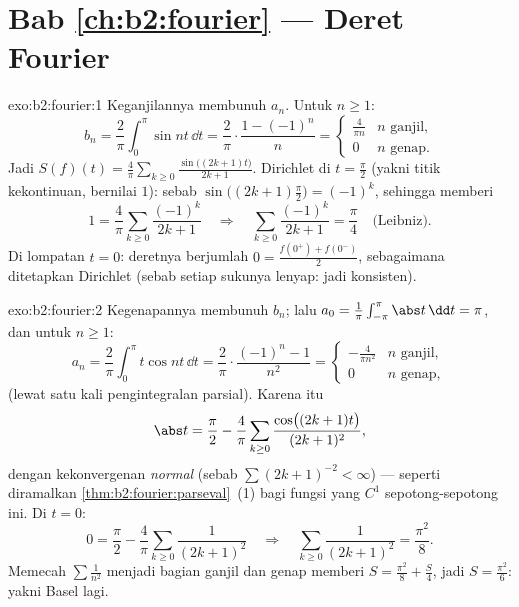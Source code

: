 \section*{Bab \ref{ch:b2:fourier} --- Deret Fourier}

\begin{solution}{exo:b2:fourier:1}
Keganjilannya membunuh $a_n$. Untuk $n \geq 1$:
\[
b_n = \frac{2}{\pi}\int_0^{\pi} \sin nt\,\dd t
= \frac{2}{\pi}\cdot\frac{1 - (-1)^n}{n}
= \begin{cases} \frac{4}{\pi n} & n \text{ ganjil},\\ 0 & n
\text{ genap}. \end{cases}
\]
Jadi $S(f)(t) = \frac{4}{\pi}\sum_{k\geq0} \frac{\sin\bigl((2k+1)t
\bigr)}{2k+1}$. Dirichlet di $t = \frac\pi2$ (yakni titik kekontinuan,
bernilai $1$): sebab $\sin\bigl((2k+1)\frac\pi2\bigr) = (-1)^k$, sehingga memberi
\[
1 = \frac4\pi \sum_{k\geq0}\frac{(-1)^k}{2k+1}
\quad\Longrightarrow\quad
\sum_{k\geq0}\frac{(-1)^k}{2k+1} = \frac{\pi}{4}
\quad\text{(Leibniz)}.
\]
Di lompatan $t = 0$: deretnya berjumlah $0 = \frac{f(0^+) +
f(0^-)}{2}$, sebagaimana ditetapkan Dirichlet (sebab setiap sukunya lenyap:
jadi konsisten).
\end{solution}

\begin{solution}{exo:b2:fourier:2}
Kegenapannya membunuh $b_n$; lalu $a_0 = \frac{1}{\pi}\int_{-\pi}^\pi\abs
t\,\dd t = \pi$, dan untuk $n \geq 1$:
\[
a_n = \frac{2}{\pi}\int_0^\pi t\cos nt\,\dd t
= \frac{2}{\pi}\cdot\frac{(-1)^n - 1}{n^2}
= \begin{cases} -\frac{4}{\pi n^2} & n \text{ ganjil},\\ 0 & n
\text{ genap}, \end{cases}
\]
(lewat satu kali pengintegralan parsial). Karena itu
\[
\abs t = \frac{\pi}{2} - \frac{4}{\pi}\sum_{k\geq0}
\frac{\cos\bigl((2k+1)t\bigr)}{(2k+1)^2} ,
\]
dengan kekonvergenan \emph{normal} (sebab $\sum (2k+1)^{-2} < \infty$) --- seperti
diramalkan \cref{thm:b2:fourier:parseval}~(1) bagi fungsi  yang
$C^1$ sepotong-sepotong ini. Di $t = 0$:
\[
0 = \frac\pi2 - \frac4\pi\sum_{k\geq0}\frac{1}{(2k+1)^2}
\quad\Longrightarrow\quad
\sum_{k\geq0}\frac{1}{(2k+1)^2} = \frac{\pi^2}{8} .
\]
Memecah $\sum \frac{1}{n^2}$ menjadi bagian ganjil dan genap memberi $S =
\frac{\pi^2}{8} + \frac S4$, jadi $S = \frac{\pi^2}{6}$: yakni Basel lagi.
\end{solution}

